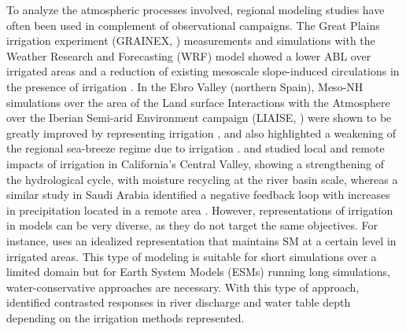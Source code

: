 To analyze the atmospheric processes involved, regional modeling studies have often been used in complement of observational campaigns. The Great Plains irrigation experiment (GRAINEX, \cite{rappin_great_2021}) measurements and simulations with the Weather Research and Forecasting (WRF) model showed a lower ABL over irrigated areas and a reduction of existing mesoscale slope-induced circulations in the presence of irrigation \citep{rappin_landatmosphere_2022, phillips_influence_2022}. In the Ebro Valley (northern Spain), Meso-NH simulations over the area of the Land surface Interactions with the Atmosphere over the Iberian Semi-arid Environment campaign (LIAISE, \cite{boone_land_2019}) were shown to be greatly improved by representing irrigation \citep{lunel_irrigation_2024}, and also highlighted a weakening of the regional sea-breeze regime due to irrigation \citep{lunel_marinada_2024}.
\citet{lo_irrigation_2013} and \citet{yang_impact_2017} studied local and remote impacts of irrigation in California's Central Valley, showing a strengthening of the hydrological cycle, with moisture recycling at the river basin scale, whereas a similar study in Saudi Arabia identified a negative feedback loop with increases in precipitation located in a remote area \citep{lo_intense_2021}.
However, representations of irrigation in models can be very diverse, as they do not target the same objectives. For instance, \citet{lunel_irrigation_2024} uses an idealized representation that maintains SM at a certain level in irrigated areas. This type of modeling is suitable for short simulations over a limited domain but for Earth System Models (ESMs) running long simulations, water-conservative approaches are necessary. With this type of approach, \citet{leng_significant_2017} identified contrasted responses in river discharge and water table depth depending on the irrigation methods represented. 

